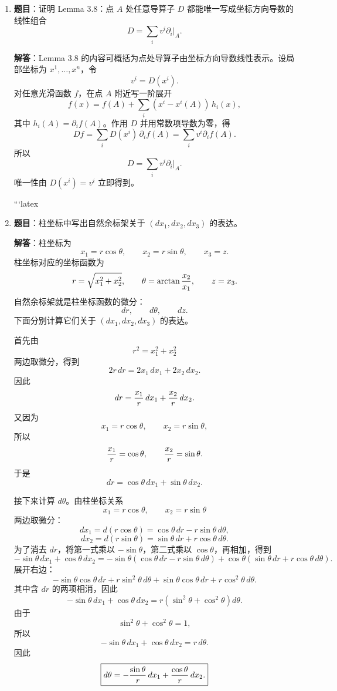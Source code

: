 \documentclass[UTF8,12pt,a4paper]{ctexart}
\begin{document}
\begin{enumerate}
\textbf{解答}：若 $\sim$ 表示在点 $A$ 处给出相同导数作用，则自反性显然成立；对称性来自等号对称；传递性来自等号传递。若 $u\sim u'$、$v\sim v'$，则对任意函数 $f$，
\[
(u+v)f=uf+vf=u'f+v'f=(u'+v')f,
\]
故 $u+v\sim u'+v'$。同理
\[
(\lambda u)f=\lambda uf=\lambda u'f=(\lambda u')f.
\]
因此加法和数乘不依赖代表元，商空间向量运算良定义。

\item \textbf{题目}：证明 Lemma 3.8：点 $A$ 处任意导算子 $D$ 都能唯一写成坐标方向导数的线性组合
\[
D=\sum_i v^i\partial_i|_A.
\]

\textbf{解答}：Lemma 3.8 的内容可概括为点处导算子由坐标方向导数线性表示。设局部坐标为 $x^1,\dots,x^n$，令
\[
v^i=D(x^i).
\]
对任意光滑函数 $f$，在点 $A$ 附近写一阶展开
\[
f(x)=f(A)+\sum_i (x^i-x^i(A))\,h_i(x),
\]
其中 $h_i(A)=\partial_i f(A)$。作用 $D$ 并用常数项导数为零，得
\[
Df=\sum_i D(x^i)\,\partial_i f(A)=\sum_i v^i\partial_i f(A).
\]
所以
\[
\boxed{D=\sum_i v^i\partial_i|_A.}
\]
唯一性由 $D(x^i)=v^i$ 立即得到。

```latex
\item \textbf{题目}：柱坐标中写出自然余标架关于 $(dx_1,dx_2,dx_3)$ 的表达。

\textbf{解答}：柱坐标为
\[
x_1=r\cos\theta,\qquad x_2=r\sin\theta,\qquad x_3=z.
\]
柱坐标对应的坐标函数为
\[
r=\sqrt{x_1^2+x_2^2},\qquad 
\theta=\arctan {x_2\over x_1},\qquad 
z=x_3.
\]
自然余标架就是柱坐标函数的微分：
\[
dr,\qquad d\theta,\qquad dz.
\]
下面分别计算它们关于 $(dx_1,dx_2,dx_3)$ 的表达。

首先由
\[
r^2=x_1^2+x_2^2
\]
两边取微分，得到
\[
2r\,dr=2x_1\,dx_1+2x_2\,dx_2.
\]
因此
\[
dr={x_1\over r}\,dx_1+{x_2\over r}\,dx_2.
\]
又因为
\[
x_1=r\cos\theta,\qquad x_2=r\sin\theta,
\]
所以
\[
{x_1\over r}=\cos\theta,\qquad {x_2\over r}=\sin\theta.
\]
于是
\[
\boxed{
	dr=\cos\theta\,dx_1+\sin\theta\,dx_2.
}
\]

接下来计算 $d\theta$。由柱坐标关系
\[
x_1=r\cos\theta,\qquad x_2=r\sin\theta
\]
两边取微分：
\[
dx_1=d(r\cos\theta)=\cos\theta\,dr-r\sin\theta\,d\theta,
\]
\[
dx_2=d(r\sin\theta)=\sin\theta\,dr+r\cos\theta\,d\theta.
\]
为了消去 $dr$，将第一式乘以 $-\sin\theta$，第二式乘以 $\cos\theta$，再相加，得到
\[
-\sin\theta\,dx_1+\cos\theta\,dx_2
=
-\sin\theta(\cos\theta\,dr-r\sin\theta\,d\theta)
+\cos\theta(\sin\theta\,dr+r\cos\theta\,d\theta).
\]
展开右边：
\[
-\sin\theta\cos\theta\,dr
+r\sin^2\theta\,d\theta
+\sin\theta\cos\theta\,dr
+r\cos^2\theta\,d\theta.
\]
其中含 $dr$ 的两项相消，因此
\[
-\sin\theta\,dx_1+\cos\theta\,dx_2
=
r(\sin^2\theta+\cos^2\theta)d\theta.
\]
由于
\[
\sin^2\theta+\cos^2\theta=1,
\]
所以
\[
-\sin\theta\,dx_1+\cos\theta\,dx_2=r\,d\theta.
\]
因此
\[
\boxed{
	d\theta=-{\sin\theta\over r}\,dx_1+{\cos\theta\over r}\,dx_2.
}
\]


\end{enumerate}
\end{document}
